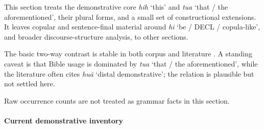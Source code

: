 \documentclass[
  11pt,
  a4paper,
]{article}
\newcommand{\tdim}[1]{\textit{#1}}
\newcommand{\glossquote}[1]{`#1'}
\begin{document}
This section treats the demonstrative core \tdim{hih} \glossquote{this}
and \tdim{tua} \glossquote{that / the aforementioned}, their plural
forms, and a small set of constructional extensions. It leaves copular
and sentence-final material around \tdim{hi}
\glossquote{be / DECL / copula-like}, and broader discourse-structure
analysis, to other sections.

The basic two-way contrast is stable in both corpus and literature
\citep{henderson1965, zamngaihcing2017}. A standing caveat is that Bible
usage is dominated by \tdim{tua} \glossquote{that / the aforementioned},
while the literature often cites \tdim{huā}
\glossquote{distal demonstrative}; the relation is plausible but not
settled here.

Raw occurrence counts are not treated as grammar facts in this section.

\paragraph{Current demonstrative
inventory}\label{current-demonstrative-inventory}
\end{document}
